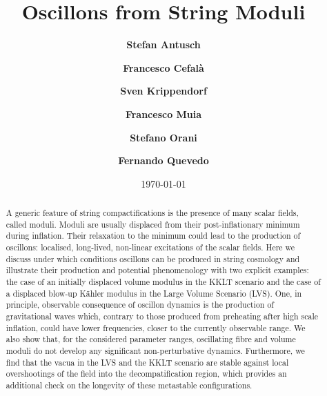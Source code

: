 \documentclass[12pt]{article}
\begin{document}
 


\title{{\bf \LARGE{Oscillons from String Moduli}}\vspace{0.6cm}
  }



\author[1,2]{\bf\small Stefan Antusch\hspace{1pt}}
\author[1]{\bf \small Francesco Cefal\`a\hspace{1pt}}
\author[3]{\bf \small Sven Krippendorf{\hspace{2pt}}}
\author[3]{\bf\small Francesco Muia\hspace{1pt}}
\author[1]{\bf\small Stefano Orani\hspace{1pt}}
\author[4,5]{\bf\small Fernando Quevedo\hspace{1pt}\vspace{0.4cm}}
\date{\small\today}
\maketitle


\begin{abstract}
A generic feature of string compactifications is the presence of many scalar fields, called moduli. Moduli are usually displaced from their post-inflationary minimum during inflation. Their relaxation to the minimum could lead to the production of oscillons: localised, long-lived, non-linear excitations of the scalar fields. Here we discuss under which conditions oscillons can be produced in string cosmology and illustrate their production and potential phenomenology with two explicit examples: the case of an initially displaced volume modulus in the KKLT scenario and the case of a displaced blow-up K\"ahler modulus in the Large Volume Scenario (LVS). One, in principle, observable consequence of oscillon dynamics is the production of gravitational waves which, contrary to those produced from preheating after high scale inflation, could have lower frequencies, closer to the currently observable range. We also show that, for the considered parameter ranges, oscillating fibre and volume moduli do not develop any significant non-perturbative dynamics. Furthermore, we find that the vacua in the LVS and the KKLT scenario are stable against local overshootings of the field into the decompatification region, which provides an additional check on the longevity of these metastable configurations.
\end{abstract}
\newpage
\end{document}
